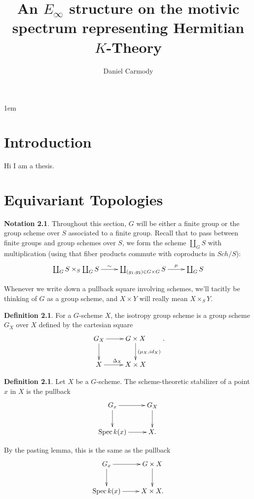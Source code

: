 \documentclass[draftthesis,tocnosub,noragright,centerchapter,10pt]{uiucthesis2009}
\title{An $E_\infty$ structure on the motivic spectrum representing
  Hermitian $K$-Theory}
\author{Daniel Carmody}
\DeclareMathOperator{\Spec}{Spec}
\theoremstyle{plain}
\theoremstyle{definition}
\newtheorem{definition}[lemma]{Definition}
\newtheorem{notation}[lemma]{Notation}
\begin{document}
\maketitle

\parindent 1em%

\frontmatter

\tableofcontents

\mainmatter

\chapter{Introduction}

Hi I am a thesis.

\chapter{Equivariant Topologies}

\begin{notation}
Throughout this section, $G$ will be either a finite group or the
group scheme over $S$ associated to a finite group. Recall that to pass between
finite groups and group schemes over $S$, we form the scheme
$\coprod_G S$ with multiplication (using that fiber products commute
with coproducts in $Sch/S$):
\[
\xymatrix{\coprod_G S \times_S \coprod_G S \ar[r]^-\sim &\coprod_{(g_1,g_2)\in G \times
  G} S \ar[r]^-{\mu}& \coprod_G S}
\]

Whenever we write down a pullback square involving schemes, we'll
tacitly be thinking of $G$ as a group scheme, and $X \times Y$ will
really mean $X \times_S Y$.
\end{notation}


\begin{definition}
For a $G$-scheme $X$, the isotropy group scheme is a group scheme
$G_X$ over $X$ defined by the cartesian square
\[
\xymatrix{G_X \ar[r] \ar[d] & G \times X \ar[d]^{(\mu_X,id_X)} \\ X
  \ar[r]^{\Delta_X} & X \times X}.
\]
\end{definition}

\begin{definition}
Let $X$ be a $G$-scheme. The scheme-theoretic stabilizer of a point
$x$ in $X$ is the pullback
\[
\xymatrix{G_x \ar[r] \ar[d] & G_X \ar[d]\\ \Spec k(x) \ar[r] & X.}
\]

By the pasting lemma, this is the same as the pullback
\[
\xymatrix{G_x \ar[r] \ar[d] & G \times X \ar[d]\\ \Spec k(x) \ar[r] &
  X \times X.}
\]
\end{definition}
\end{document}

